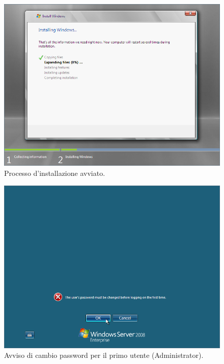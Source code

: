\begin{figure}[htbp]
 \centering
 \includegraphics[scale=0.5]{images/grab0011}
 \caption{Processo d’installazione avviato.}
\label{fig:grab0011}
\end{figure}

\begin{figure}[htbp]
 \centering
 \includegraphics[scale=0.5]{images/grab0012}
 \caption{Avviso di cambio password per il primo utente (Administrator).}
\label{fig:grab0012}
\end{figure}

